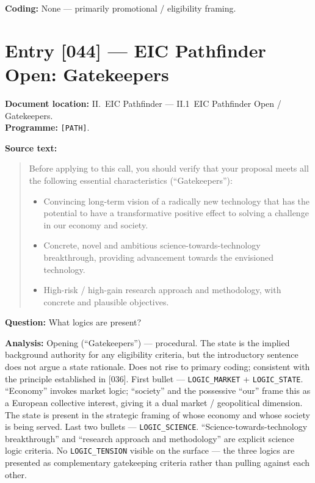\textbf{Coding:} None --- primarily promotional / eligibility framing.

\section*{Entry [044] --- EIC Pathfinder Open: Gatekeepers}

\textbf{Document location:} II.~EIC Pathfinder --- II.1~EIC Pathfinder
Open / Gatekeepers. \\
\textbf{Programme:} \texttt{[PATH]}.

\textbf{Source text:}
\begin{quote}
Before applying to this call, you should verify that your proposal
meets all the following essential characteristics
(\enquote{Gatekeepers}):
\begin{itemize}[leftmargin=*]
  \item Convincing long-term vision of a radically new technology that
    has the potential to have a transformative positive effect to
    solving a challenge in our economy and society.
  \item Concrete, novel and ambitious science-towards-technology
    breakthrough, providing advancement towards the envisioned
    technology.
  \item High-risk / high-gain research approach and methodology, with
    concrete and plausible objectives.
\end{itemize}
\end{quote}

\textbf{Question:} What logics are present?

\textbf{Analysis:} Opening (\enquote{Gatekeepers}) --- procedural. The
state is the implied background authority for any eligibility
criteria, but the introductory sentence does not argue a state
rationale. Does not rise to primary coding; consistent with the
principle established in [036]. First bullet ---
\texttt{LOGIC\_MARKET} + \texttt{LOGIC\_STATE}. \enquote{Economy}
invokes market logic; \enquote{society} and the possessive
\enquote{our} frame this as a European collective interest, giving it
a dual market / geopolitical dimension. The state is present in the
strategic framing of whose economy and whose society is being served.
Last two bullets --- \texttt{LOGIC\_SCIENCE}.
\enquote{Science-towards-technology breakthrough} and \enquote{research
approach and methodology} are explicit science logic criteria. No
\texttt{LOGIC\_TENSION} visible on the surface --- the three logics
are presented as complementary gatekeeping criteria rather than
pulling against each other.

